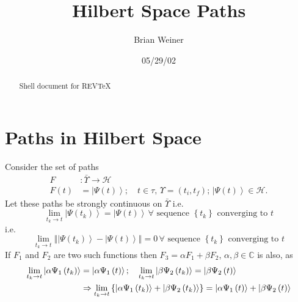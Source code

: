 \documentclass[aps,preprint]{revtex4}
\begin{document}
\preprint{}
\title[H paths]{Hilbert Space Paths}
\author{Brian Weiner}

\begin{abstract}
Shell document for REV\TeX
\end{abstract}

\date{05/29/02}
\maketitle
\tableofcontents

\section{Paths in Hilbert Space}

Consider the set of paths 
\begin{align}
F& :\bar{\Upsilon}\rightarrow \mathcal{H} \\
F\left( t\right) & =\left\vert \Psi \left( t\right) \right\rangle ;\quad
t\in \tau ,\,\Upsilon =\left( t_{i},t_{f}\right) ;\,\left\vert \Psi \left(
t\right) \right\rangle \in \mathcal{H}.
\end{align}%
Let these paths be strongly continuous on $\bar{\Upsilon}$ i.e. 
\begin{equation}
\lim_{t_{k}\rightarrow t}\left\vert \Psi \left( t_{k}\right) \right\rangle
=\left\vert \Psi \left( t\right) \right\rangle \,\forall \text{ sequence }%
\left\{ t_{k}\right\} \text{ converging to }t
\end{equation}%
i.e.%
\begin{equation}
\lim_{t_{k}\rightarrow t}\left\Vert \left\vert \Psi \left( t_{k}\right)
\right\rangle -\left\vert \Psi \left( t\right) \right\rangle \right\Vert
=0\,\forall \text{ sequence }\left\{ t_{k}\right\} \text{ converging to }t
\end{equation}%
If $F_{1}$ and $F_{2}$ are two such functions then $F_{3}=\alpha F_{1}+\beta
F_{2}$, $\alpha ,\beta \in \mathbb{C}$ is also, as 
\begin{align}
\lim_{t_{k}\rightarrow t}\left\vert \alpha \Psi _{1}\left( t_{k}\right)
\right\rangle & =\left\vert \alpha \Psi _{1}\left( t\right) \right\rangle
;\quad \lim_{t_{k}\rightarrow t}\left\vert \beta \Psi _{2}\left(
t_{k}\right) \right\rangle =\left\vert \beta \Psi _{2}\left( t\right)
\right\rangle   \notag \\
& \Rightarrow \lim_{t_{k}\rightarrow t}\left\{ \left\vert \alpha \Psi
_{1}\left( t_{k}\right) \right\rangle +\left\vert \beta \Psi _{2}\left(
t_{k}\right) \right\rangle \right\} =\left\vert \alpha \Psi _{1}\left(
t\right) \right\rangle +\left\vert \beta \Psi _{2}\left( t\right)
\right\rangle 
\end{align}%
\end{document}
